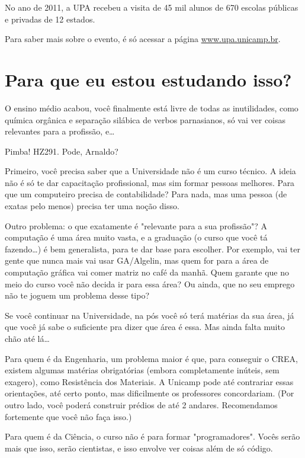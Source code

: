 No ano de 2011, a UPA recebeu a visita de 45 mil alunos de 670 escolas públicas
e privadas de 12 estados.

Para saber mais sobre o evento, é só acessar a página
\url{www.upa.unicamp.br}.

\section{Para que eu estou estudando isso?}

O ensino médio acabou, você finalmente está livre de todas as inutilidades, como
química orgânica e separação silábica de verbos parnasianos, só vai ver coisas
relevantes para a profissão, e{\dots}

Pimba! HZ291. Pode, Arnaldo?

Primeiro, você precisa saber que a Universidade não é um curso técnico. A ideia
não é só te dar capacitação profissional, mas sim formar pessoas melhores. Para
que um computeiro precisa de contabilidade? Para nada, mas uma pessoa (de exatas
pelo menos) precisa ter uma noção disso.

Outro problema: o que exatamente é "relevante para a sua profissão"?
A computação é uma área muito vasta, e a graduação (o curso que você tá
fazendo{\dots}) é bem generalista, para te dar base para escolher. Por exemplo,
vai ter gente que nunca mais vai usar GA/Algelin, mas quem for para a área de
computação gráfica vai comer matriz no café da manhã. Quem garante que no meio
do curso você não decida ir para essa área? Ou ainda, que no seu emprego não te
joguem um problema desse tipo?

Se você continuar na Universidade, na pós você só terá matérias da sua área, já
que você já sabe o suficiente pra dizer que área é essa. Mas ainda falta muito
chão até lá{\dots}

Para quem é da Engenharia, um problema maior é que, para conseguir o CREA,
existem algumas matérias obrigatórias (embora completamente inúteis, sem
exagero), como Resistência dos Materiais. A Unicamp pode até contrariar essas orientações, até
certo ponto, mas dificilmente os professores concordariam. (Por outro lado,
você poderá construir prédios de até 2 andares. Recomendamos fortemente que você
não faça isso.)

Para quem é da Ciência, o curso não é para formar "programadores". Vocês serão
mais que isso, serão cientistas, e isso envolve ver coisas além de só código.
